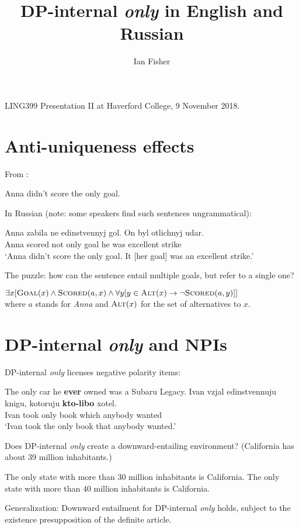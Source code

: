 \documentclass{article}
\title{DP-internal \textit{only} in English and Russian}
\author{Ian Fisher}
\date{}
\begin{document}
\maketitle

\noindent LING399 Presentation II at Haverford College, 9 November 2018.

\section{Anti-uniqueness effects}
From \citet{cb2015}:

\begin{exe}
	\ex Anna didn't score the only goal.
\end{exe}

\noindent In Russian (note: some speakers find such sentences ungrammatical):
\begin{exe}
	\ex \gll Anna zabila ne edinstvennyj gol. On byl otlichnyj udar.\\
	Anna scored not only goal he was excellent strike\\
	\glt `Anna didn't score the only goal. It [her goal] was an excellent strike.'
\end{exe}

\noindent The puzzle: how can the sentence entail multiple goals, but refer to a single one?

\begin{exe}
	\ex $\exists x [ \textsc{Goal}(x) \land \textsc{Scored}(a, x) \land \forall y [ y \in \textsc{Alt}(x) \to \neg \textsc{Scored}(a, y)] ]$\\ where $a$ stands for \textit{Anna} and $\textsc{Alt}(x)$ for the set of alternatives to $x$.
\end{exe}


\section{DP-internal \textit{only} and NPIs}
DP-internal \textit{only} licenses negative polarity items:

\begin{exe}
	\ex The only car he \textbf{ever} owned was a Subaru Legacy.
	\ex \gll Ivan vzjal edinstvennuju knigu, kotoruju \textbf{kto-libo} xotel.\\
	Ivan took only book which anybody wanted\\
	\glt `Ivan took the only book that anybody wanted.'
\end{exe}

\noindent Does DP-internal \textit{only} create a downward-entailing environment? (California has about 39 million inhabitants.)

\begin{exe}
	\ex The only state with more than 30 million inhabitants is California.
	\ex The only state with more than 40 million inhabitants is California.
\end{exe}

\noindent Generalization: Downward entailment for DP-internal \textit{only} holds, subject to the existence presupposition of the definite article.


\end{document}
